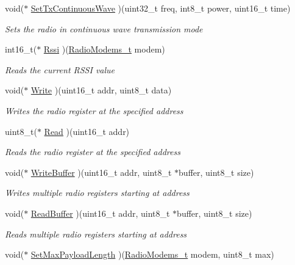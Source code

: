 \begin{DoxyCompactItemize}
void($\ast$ \mbox{\hyperlink{struct_radio__s_a33dccb0bc830d9a68ec0c2e75b74e541}{Set\+Tx\+Continuous\+Wave}} )(uint32\+\_\+t freq, int8\+\_\+t power, uint16\+\_\+t time)
\begin{DoxyCompactList}\small\item\em Sets the radio in continuous wave transmission mode \end{DoxyCompactList}\item 
int16\+\_\+t($\ast$ \mbox{\hyperlink{struct_radio__s_ad973f70640c019eb62ac88f25fb9b75f}{Rssi}} )(\mbox{\hyperlink{radio_8h_a992ef7a5b7f52975ba7bd8dd97740057}{Radio\+Modems\+\_\+t}} modem)
\begin{DoxyCompactList}\small\item\em Reads the current R\+S\+SI value \end{DoxyCompactList}\item 
void($\ast$ \mbox{\hyperlink{struct_radio__s_aa10c31bc66c525698fd57d5dea5a888a}{Write}} )(uint16\+\_\+t addr, uint8\+\_\+t data)
\begin{DoxyCompactList}\small\item\em Writes the radio register at the specified address \end{DoxyCompactList}\item 
uint8\+\_\+t($\ast$ \mbox{\hyperlink{struct_radio__s_a37d2eb5c32dc2461524b7f611627cb37}{Read}} )(uint16\+\_\+t addr)
\begin{DoxyCompactList}\small\item\em Reads the radio register at the specified address \end{DoxyCompactList}\item 
void($\ast$ \mbox{\hyperlink{struct_radio__s_a781ffc8e38fd30e4148890c8062c70f5}{Write\+Buffer}} )(uint16\+\_\+t addr, uint8\+\_\+t $\ast$buffer, uint8\+\_\+t size)
\begin{DoxyCompactList}\small\item\em Writes multiple radio registers starting at address \end{DoxyCompactList}\item 
void($\ast$ \mbox{\hyperlink{struct_radio__s_a95dd91574c0eeb271533bd62bf9a1d7e}{Read\+Buffer}} )(uint16\+\_\+t addr, uint8\+\_\+t $\ast$buffer, uint8\+\_\+t size)
\begin{DoxyCompactList}\small\item\em Reads multiple radio registers starting at address \end{DoxyCompactList}\item 
void($\ast$ \mbox{\hyperlink{struct_radio__s_a19598b798e8b165378b397515c673d1c}{Set\+Max\+Payload\+Length}} )(\mbox{\hyperlink{radio_8h_a992ef7a5b7f52975ba7bd8dd97740057}{Radio\+Modems\+\_\+t}} modem, uint8\+\_\+t max)

\end{DoxyCompactItemize}
